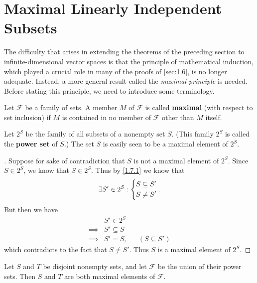 \section{Maximal Linearly Independent Subsets}\label{sec:1.7}

\begin{note}
  The difficulty that arises in extending the theorems of the preceding section to infinite-dimensional vector spaces is that the principle of mathematical induction, which played a crucial role in many of the proofs of \cref{sec:1.6}, is no longer adequate.
  Instead, a more general result called the \emph{maximal principle} is needed.
  Before stating this principle, we need to introduce some terminology.
\end{note}

\begin{defn}\label{1.7.1}
  Let \(\mathcal{F}\) be a family of sets.
  A member \(M\) of \(\mathcal{F}\) is called \textbf{maximal} (with respect to set inclusion) if \(M\) is contained in no member of \(\mathcal{F}\) other than \(M\) itself.
\end{defn}

\begin{eg}\label{1.7.2}
  Let \(2^S\) be the family of all subsets of a nonempty set \(S\).
  (This family \(2^S\) is called the \textbf{power set} of \(S\).)
  The set \(S\) is easily seen to be a maximal element of \(2^S\).
\end{eg}

\begin{proof}[]
  Suppose for sake of contradiction that \(S\) is not a maximal element of \(2^S\).
  Since \(S \in 2^S\), we know that \(S \in 2^S\).
  Thus by \cref{1.7.1} we know that
  \[
    \exists S' \in 2^S : \begin{dcases}
      S \subseteq S' \\
      S \neq S'
    \end{dcases}.
  \]
  But then we have
  \begin{align*}
             & S' \in 2^S                           \\
    \implies & S' \subseteq S                       \\
    \implies & S' = S,        &  & (S \subseteq S')
  \end{align*}
  which contradicts to the fact that \(S \neq S'\).
  Thus \(S\) is a maximal element of \(2^S\).
\end{proof}

\begin{eg}\label{1.7.3}
  Let \(S\) and \(T\) be disjoint nonempty sets, and let \(\mathcal{F}\) be the union of their power sets.
  Then \(S\) and \(T\) are both maximal elements of \(\mathcal{F}\).
\end{eg}

